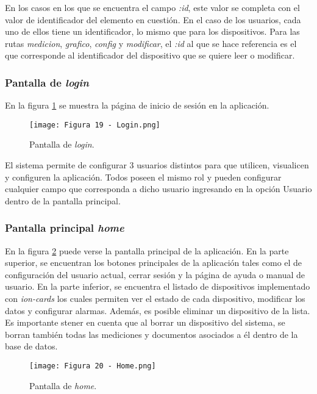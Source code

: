 En los casos en los que se encuentra el campo \textit{:id}, este valor se completa con el valor de identificador del elemento en cuestión. En el caso de los usuarios, cada uno de ellos tiene un identificador, lo mismo que para los dispositivos. Para las rutas \textit{medicion}, \textit{grafico}, \textit{config} y \textit{modificar}, el \textit{:id} al que se hace referencia es el que corresponde al identificador del dispositivo que se quiere leer o modificar.

\subsubsection{Pantalla de \textit{login}}

En la figura \ref{fig:19} se muestra la página de inicio de sesión en la aplicación.

\begin{figure}[h]
\centering
\texttt{[image: Figura 19 - Login.png]}
\caption[Pantalla de login]{Pantalla de \textit{login}.}
\label{fig:19}
\end{figure}

El sistema permite de configurar 3 usuarios distintos para que utilicen, visualicen y configuren la aplicación. Todos poseen el mismo rol y pueden configurar cualquier campo que corresponda a dicho usuario ingresando en la opción Usuario dentro de la pantalla principal.

\subsubsection{Pantalla principal \textit{home}}

En la figura \ref{fig:20} puede verse la pantalla principal de la aplicación. En la parte superior, se encuentran los botones principales de la aplicación tales como el de configuración del usuario actual, cerrar sesión y la página de ayuda o manual de usuario. En la parte inferior, se encuentra el listado de dispositivos implementado con \textit{ion-cards} los cuales permiten ver el estado de cada dispositivo, modificar los datos y configurar alarmas. Además, es posible eliminar un dispositivo de la lista. Es importante stener en cuenta que al borrar un dispositivo del sistema, se borran también todas las mediciones y documentos asociados a él dentro de la base de datos.

\begin{figure}[h]
\centering
\texttt{[image: Figura 20 - Home.png]}
\caption[Pantalla de home]{Pantalla de \textit{home}.}
\label{fig:20}
\end{figure}


